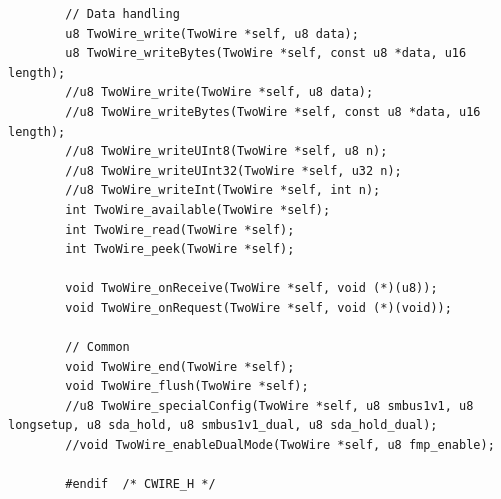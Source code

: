 \documentclass[11pt,a4paper,titlepage]{report}
\begin{document}
\begin{lstlisting}
		// Data handling
		u8 TwoWire_write(TwoWire *self, u8 data);
		u8 TwoWire_writeBytes(TwoWire *self, const u8 *data, u16 length);
		//u8 TwoWire_write(TwoWire *self, u8 data);
		//u8 TwoWire_writeBytes(TwoWire *self, const u8 *data, u16 length);
		//u8 TwoWire_writeUInt8(TwoWire *self, u8 n);
		//u8 TwoWire_writeUInt32(TwoWire *self, u32 n);
		//u8 TwoWire_writeInt(TwoWire *self, int n);
		int TwoWire_available(TwoWire *self);
		int TwoWire_read(TwoWire *self);
		int TwoWire_peek(TwoWire *self);
		
		void TwoWire_onReceive(TwoWire *self, void (*)(u8));
		void TwoWire_onRequest(TwoWire *self, void (*)(void));
		
		// Common
		void TwoWire_end(TwoWire *self);
		void TwoWire_flush(TwoWire *self);
		//u8 TwoWire_specialConfig(TwoWire *self, u8 smbus1v1, u8 longsetup, u8 sda_hold, u8 smbus1v1_dual, u8 sda_hold_dual);
		//void TwoWire_enableDualMode(TwoWire *self, u8 fmp_enable);
		
		#endif	/* CWIRE_H */
	\end{lstlisting}
	
\end{document}
